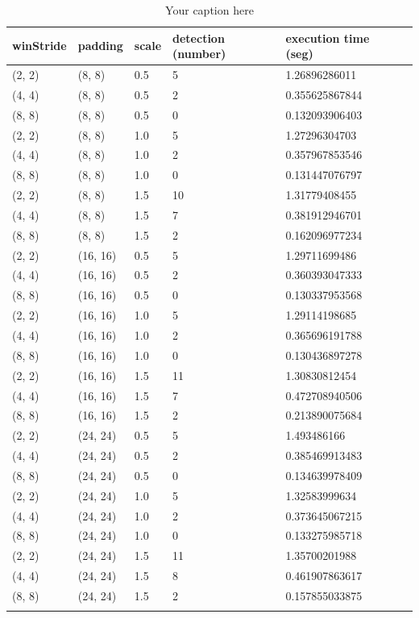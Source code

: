 \begin{longtable}{|l|l|l|l|l|l|} 
	\hline
	\textbf{winStride} & \textbf{padding} & \textbf{scale} & \textbf{detection (number)} & \textbf{execution time (seg)} \\ \hline
	(2, 2) & (8, 8) & 0.5 & 5 & 1.26896286011 \\ \hline
	(4, 4) & (8, 8) & 0.5 & 2 & 0.355625867844 \\ \hline
	(8, 8) & (8, 8) & 0.5 & 0 & 0.132093906403 \\ \hline
	(2, 2) & (8, 8) & 1.0 & 5 & 1.27296304703 \\ \hline
	(4, 4) & (8, 8) & 1.0 & 2 & 0.357967853546 \\ \hline
	(8, 8) & (8, 8) & 1.0 & 0 & 0.131447076797 \\ \hline
	(2, 2) & (8, 8) & 1.5 & 10 & 1.31779408455 \\ \hline
	(4, 4) & (8, 8) & 1.5 & 7 & 0.381912946701 \\ \hline
	(8, 8) & (8, 8) & 1.5 & 2 & 0.162096977234 \\ \hline
	(2, 2) & (16, 16) & 0.5 & 5 & 1.29711699486 \\ \hline
	(4, 4) & (16, 16) & 0.5 & 2 & 0.360393047333 \\ \hline
	(8, 8) & (16, 16) & 0.5 & 0 & 0.130337953568 \\ \hline
	(2, 2) & (16, 16) & 1.0 & 5 & 1.29114198685 \\ \hline
	(4, 4) & (16, 16) & 1.0 & 2 & 0.365696191788 \\ \hline
	(8, 8) & (16, 16) & 1.0 & 0 & 0.130436897278 \\ \hline
	(2, 2) & (16, 16) & 1.5 & 11 & 1.30830812454 \\ \hline
	(4, 4) & (16, 16) & 1.5 & 7 & 0.472708940506 \\ \hline
	(8, 8) & (16, 16) & 1.5 & 2 & 0.213890075684 \\ \hline
	(2, 2) & (24, 24) & 0.5 & 5 & 1.493486166 \\ \hline
	(4, 4) & (24, 24) & 0.5 & 2 & 0.385469913483 \\ \hline
	(8, 8) & (24, 24) & 0.5 & 0 & 0.134639978409 \\ \hline
	(2, 2) & (24, 24) & 1.0 & 5 & 1.32583999634 \\ \hline
	(4, 4) & (24, 24) & 1.0 & 2 & 0.373645067215 \\ \hline
	(8, 8) & (24, 24) & 1.0 & 0 & 0.133275985718 \\ \hline
	(2, 2) & (24, 24) & 1.5 & 11 & 1.35700201988 \\ \hline
	(4, 4) & (24, 24) & 1.5 & 8 & 0.461907863617 \\ \hline
	(8, 8) & (24, 24) & 1.5 & 2 & 0.157855033875 \\ \hline
	
	\caption{Your caption here} %
	\label{tab:myfirstlongtable}
\end{longtable}



